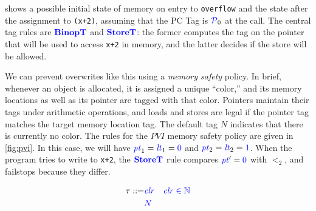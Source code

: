 \documentclass{llncs}
\begin{document}
{ shows a possible initial state of memory on entry to {\tt overflow} and the state after
the assignment to {\tt *(x+2)}, assuming that the PC Tag is \(\mathcal{\color{blue} P}_0\) at the call.
The central tag rules are \(\color{blue} \mathbf{BinopT}\) and \(\color{blue} \mathbf{StoreT}\): the former computes the tag
on the pointer that will be used to access {\tt x+2} in memory, and the latter decides if the
store will be allowed.

We can prevent overwrites like this using a {\em memory safety} policy. In brief, whenever
an object is allocated, it is assigned a unique ``color,'' and its memory locations as well
as its pointer are tagged with that color. Pointers maintain their tags under arithmetic
operations, and loads and stores are legal if the pointer tag matches the target memory location tag.
The default tag \(N\) indicates that there is currently no color.
The rules for the \(PVI\) memory safety policy are given in \cref{fig:pvi}. In this case, we will
have \(\mathit{\color{blue} pt}_1 = \mathit{\color{blue} lt}_1 = {\color{blue} 0}\) and \(\mathit{\color{blue} pt}_2 = \mathit{\color{blue} lt}_2 = {\color{blue} 1}\). When the program tries to write to {\tt x+2},
the \(\color{blue} \mathbf{StoreT}\) rule compares \(\mathit{\color{blue} pt}' = {\color{blue} 0}\) with \(\lt_2\), and failstops because they differ.

\begin{figure}
  \color{blue}
  \begin{align*}
    \tau ::= & \color{blue} \mathit{clr} & \color{blue} \mathit{clr} \in \mathbb{N} \\
    & {\color{blue} N} \\
  \end{align*}
  
  \scriptsize
  \begin{minipage}[t]{0.3\textwidth}
    \vspace{-2.5em}


\end{minipage}
\end{figure}}
\end{document}
